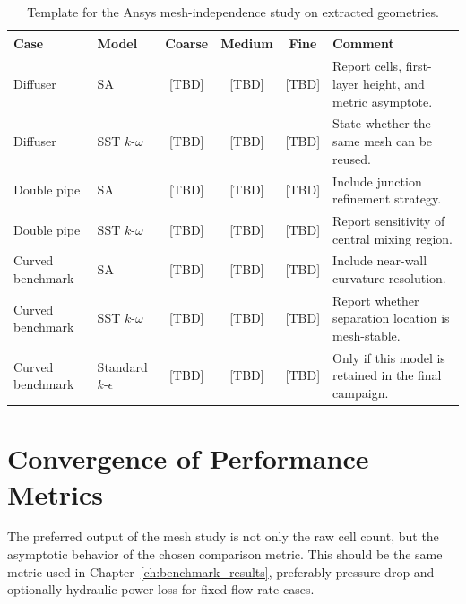 \begin{table}[htbp]
	\centering
	\footnotesize
	\caption{Template for the Ansys mesh-independence study on extracted geometries.}
	\label{tab:app_validation_mesh_template}
	\renewcommand{\arraystretch}{1.2}
	\begin{tabularx}{\textwidth}{l l c c c X}
		\hline
		\textbf{Case} & \textbf{Model} & \textbf{Coarse} & \textbf{Medium} & \textbf{Fine} & \textbf{Comment} \\
		\hline
		Diffuser & SA & [TBD] & [TBD] & [TBD] & Report cells, first-layer height, and metric asymptote. \\
		Diffuser & SST $k$-$\omega$ & [TBD] & [TBD] & [TBD] & State whether the same mesh can be reused. \\
		Double pipe & SA & [TBD] & [TBD] & [TBD] & Include junction refinement strategy. \\
		Double pipe & SST $k$-$\omega$ & [TBD] & [TBD] & [TBD] & Report sensitivity of central mixing region. \\
		Curved benchmark & SA & [TBD] & [TBD] & [TBD] & Include near-wall curvature resolution. \\
		Curved benchmark & SST $k$-$\omega$ & [TBD] & [TBD] & [TBD] & Report whether separation location is mesh-stable. \\
		Curved benchmark & Standard $k$-$\epsilon$ & [TBD] & [TBD] & [TBD] & Only if this model is retained in the final campaign. \\
		\hline
	\end{tabularx}
\end{table}

\section{Convergence of Performance Metrics}
The preferred output of the mesh study is not only the raw cell count, but the asymptotic behavior of the chosen comparison metric. This should be the same metric used in Chapter~\ref{ch:benchmark_results}, preferably pressure drop and optionally hydraulic power loss for fixed-flow-rate cases.

